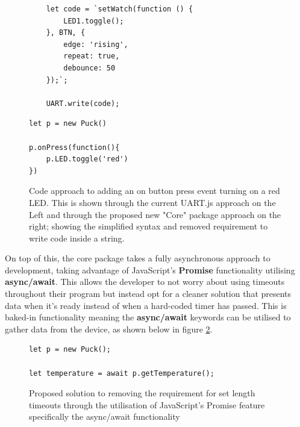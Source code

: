 \documentclass{l4proj}
\begin{document}
\begin{figure}[!ht]
\centering
\begin{minipage}{6cm}
  \centering
  \begin{lstlisting}
    let code = `setWatch(function () {
        LED1.toggle();
    }, BTN, {
        edge: 'rising',
        repeat: true,
        debounce: 50
    });`;

    UART.write(code);
  \end{lstlisting}
\end{minipage}
\hspace{1cm}
\begin{minipage}{6cm}
  \centering
  
  \begin{lstlisting}
let p = new Puck()

p.onPress(function(){
    p.LED.toggle('red')
})
  \end{lstlisting}
\end{minipage}
  \caption{Code approach to adding an on button press event turning on a red LED. This is shown through the current UART.js approach on the Left and through the proposed new "Core" package approach on the right; showing the simplified syntax and removed requirement to write code inside a string.}
  \label{fig:code_approach}
\end{figure}

On top of this, the core package takes a fully asynchronous approach to development, taking advantage of JavaScript's \textbf{Promise} functionality utilising \textbf{async/await}. This allows the developer to not worry about using timeouts throughout their program but instead opt for a cleaner solution that presents data when it's ready instead of when a hard-coded timer has passed. This is baked-in functionality meaning the \textbf{async/await} keywords can be utilised to gather data from the device, as shown below in figure \ref{fig:async-await-core}.

\begin{figure}[!ht]
    \centering
    \begin{lstlisting}
let p = new Puck();

let temperature = await p.getTemperature();
    \end{lstlisting}
    \caption{Proposed solution to removing the requirement for set length timeouts through the utilisation of JavaScript's Promise feature specifically the async/await functionality}
    \label{fig:async-await-core}
\end{figure}
\end{document}

